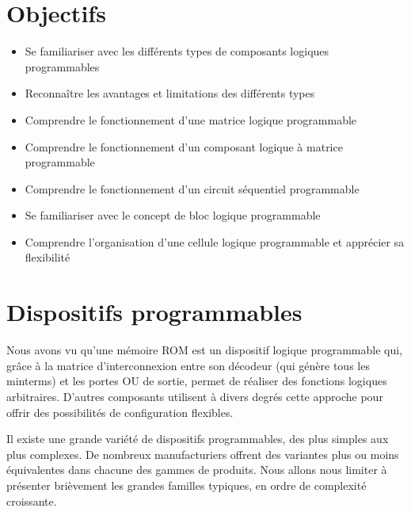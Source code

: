 \documentclass[letter, oneside]{book}
\begin{document}
\section{Objectifs}
\label{sec:org5a3875d}
\begin{itemize}
\item Se familiariser avec les différents types de composants logiques
programmables
\item Reconnaître les avantages et limitations des différents types
\item Comprendre le fonctionnement d'une matrice logique programmable
\item Comprendre le fonctionnement d'un composant logique à matrice programmable
\item Comprendre le fonctionnement d'un circuit séquentiel programmable
\item Se familiariser avec le concept de bloc logique programmable
\item Comprendre l'organisation d'une cellule logique programmable et
apprécier sa flexibilité
\end{itemize}

\section{Dispositifs programmables}
\label{sec:org59f1229}

Nous avons vu qu'une mémoire ROM est un dispositif logique
programmable qui, grâce à la matrice d'interconnexion entre son
décodeur (qui génère tous les minterms) et les portes OU de sortie,
permet de réaliser des fonctions logiques arbitraires. D'autres
composants utilisent à divers degrés cette approche pour offrir des
possibilités de configuration flexibles.

Il existe une grande variété de dispositifs programmables, des plus
simples aux plus complexes. De nombreux manufacturiers offrent des
variantes plus ou moins équivalentes dans chacune des gammes de
produits. Nous allons nous limiter à présenter brièvement les grandes
familles typiques, en ordre de complexité croissante.
\end{document}

